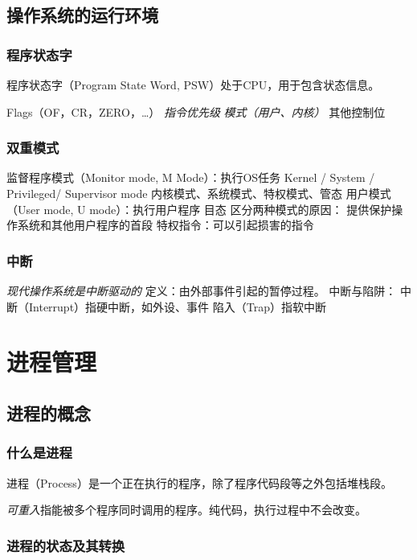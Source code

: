 \documentclass{ctexart}
\begin{document}
\subsection{操作系统的运行环境}
\subsubsection{程序状态字}
程序状态字（Program State Word, PSW）处于CPU，用于包含状态信息。
\begin{outline}
    \1 Flags（OF，CR，ZERO，\dots）
    \1 \emph{指令优先级}
    \1 \emph{模式（用户、内核）}
    \1 其他控制位
\end{outline}
\subsubsection{双重模式}
\begin{outline}
    \1 监督程序模式（Monitor mode, M Mode）：执行OS任务
        \2 Kernel / System / Privileged/ Supervisor mode
        \2 内核模式、系统模式、特权模式、管态
    \1 用户模式（User mode, U mode）：执行用户程序
        \2 目态
    \1 区分两种模式的原因：
        \2 提供保护操作系统和其他用户程序的首段
        \2 特权指令：可以引起损害的指令
\end{outline}
\subsubsection{中断}
\begin{outline}
    \1 \emph{现代操作系统是中断驱动的}
    \1 定义：由外部事件引起的暂停过程。
    \1 中断与陷阱：
        \2 中断（Interrupt）指硬中断，如外设、事件
        \2 陷入（Trap）指软中断
\end{outline}

\section{进程管理}
\subsection{进程的概念}
\subsubsection{什么是进程}
进程（Process）是一个正在执行的程序，除了程序代码段等之外包括堆栈段。 

\emph{可重入}指能被多个程序同时调用的程序。纯代码，执行过程中不会改变。
\subsubsection{进程的状态及其转换}
\end{document}
